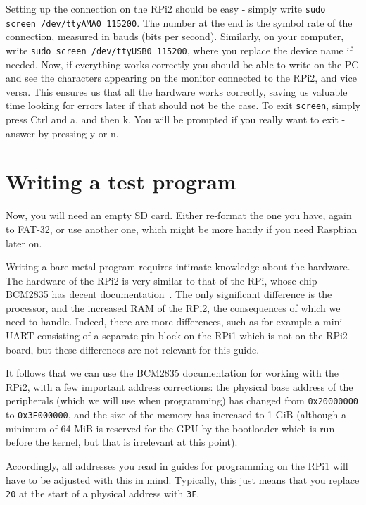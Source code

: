 \documentclass[a4paper,11pt,reqno]{amsart}
\begin{document}
Setting up the connection on the RPi2 should be easy - simply write \texttt{sudo screen /dev/ttyAMA0 115200}. The number at the end is the symbol rate of the connection, measured in bauds (bits per second). Similarly, on your computer, write \texttt{sudo screen /dev/ttyUSB0 115200}, where you replace the device name if needed. Now, if everything works correctly you should be able to write on the PC and see the characters appearing on the monitor connected to the RPi2, and vice versa. This ensures us that all the hardware works correctly, saving us valuable time looking for errors later if that should not be the case. To exit \texttt{screen}, simply press Ctrl and a, and then k. You will be prompted if you really want to exit - answer by pressing y or n.

\section{Writing a test program}
Now, you will need an empty SD card. Either re-format the one you have, again to FAT-32, or use another one, which might be more handy if you need Raspbian later on.

Writing a bare-metal program requires intimate knowledge about the hardware. The hardware of the RPi2 is very similar to that of the RPi, whose chip BCM2835 has decent documentation~\cite{bcm2835}. The only significant difference is the processor, and the increased RAM of the RPi2, the consequences of which we need to handle. Indeed, there are more differences, such as for example a mini-UART consisting of a separate pin block on the RPi1 which is not on the RPi2 board, but these differences are not relevant for this guide.

It follows that we can use the BCM2835 documentation for working with the RPi2, with a few important address corrections: the physical base address of the peripherals (which we will use when programming) has changed from \texttt{0x20000000} to \texttt{0x3F000000}, and the size of the memory has increased to 1 GiB (although a minimum of 64 MiB is reserved for the GPU by the bootloader which is run before the kernel, but that is irrelevant at this point).

Accordingly, all addresses you read in guides for programming on the RPi1 will have to be adjusted with this in mind. Typically, this just means that you replace \texttt{20} at the start of a physical address with \texttt{3F}.
\end{document}

